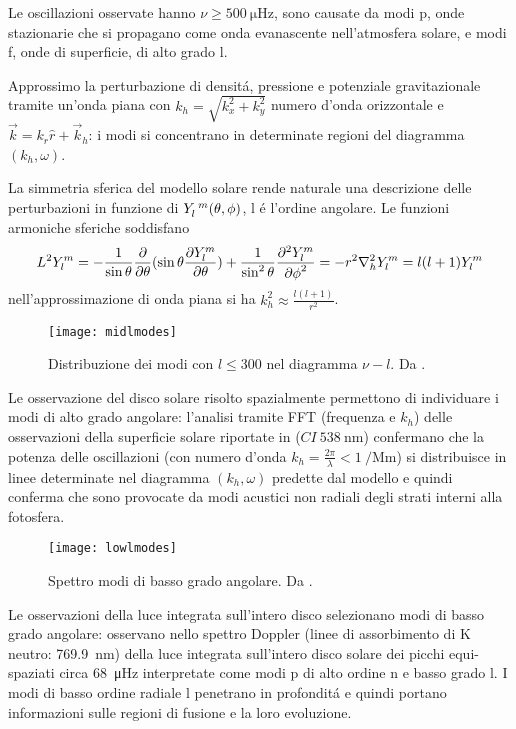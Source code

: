 \documentclass[../main.tex]{subfiles}
\begin{document}
Le oscillazioni osservate hanno $\nu\geq\SI{500}{\micro\hertz}$, sono causate da modi p, onde stazionarie che si propagano come onda evanascente nell'atmosfera solare, e modi f, onde di superficie, di alto grado l.

Approssimo la perturbazione di densit\'a, pressione e potenziale gravitazionale tramite un'onda piana con $k_h=\sqrt{k_x^2+k_y^2}$ numero d'onda orizzontale e $\vec{k}=k_r\hat{r}+\vec{k}_h$:  i modi si concentrano in determinate regioni del diagramma  $(k_h,\omega)$.

La simmetria sferica del modello solare rende naturale una descrizione delle perturbazioni in funzione di $Y\indices{_l^m}(\theta,\phi)$, l \'e l'ordine angolare. Le funzioni armoniche sferiche  soddisfano
\begin{equation}
L^2Y_l^m=-\frac{1}{\sin{\theta}}\frac{\partial}{\partial \theta}(\sin{\theta}\frac{\partial Y_l^m}{\partial \theta})+\frac{1}{\sin^2{\theta}}\frac{\partial^2 Y_l^m}{{\partial \phi}^2}=-r^2\nabla_h^2Y_l^m=l(l+1)Y_l^m\label{eq:SHperturb}
\end{equation}
nell'approssimazione di onda piana si ha $k_h^2\approx\frac{l(l+1)}{r^2}$.

\begin{minipage}[c][7cm][c]{\textwidth}
\begin{wrapfigure}[12]{r}{0.6\textwidth}
\centering
\texttt{[image: midlmodes]}
\caption{Distribuzione dei modi con $l\leq300$ nel diagramma $\nu-l$. Da \cite{chr02helioseismology}.}\label{fig:midlmodes}
\end{wrapfigure}
Le osservazione del disco solare risolto spazialmente permettono di individuare i modi di alto grado angolare: l'analisi tramite FFT (frequenza e $k_h$) delle osservazioni della superficie solare riportate in \citet{deu75observations} ($CI\ \SI{538}{\nano\meter}$) confermano che la  potenza delle oscillazioni (con numero d'onda $k_h=\frac{2\pi}{\lambda}<\SI{1}{\per\mega\meter}$) si distribuisce in linee determinate nel diagramma $(k_h,\omega)$ predette dal modello e quindi conferma che sono provocate da modi acustici non radiali degli strati interni alla fotosfera.
\end{minipage}

\begin{minipage}[c][7cm][t]{\textwidth}
\begin{wrapfigure}[11]{r}{0.6\textwidth}
\centering
\texttt{[image: lowlmodes]}
\caption{Spettro modi di basso grado angolare. Da \cite{chr02helioseismology}.}\label{fig:lowlmodes}
\end{wrapfigure}
Le osservazioni della luce integrata sull'intero disco selezionano modi di basso grado angolare: \citet{cla79solar} osservano nello spettro Doppler (linee di assorbimento di K neutro: \SI{769.9}{\nano\meter}) della luce integrata sull'intero disco solare dei picchi equi-spaziati circa \SI{68}{\micro\hertz} interpretate come modi p di alto ordine n e basso grado l. I modi di basso ordine radiale l penetrano in profondit\'a e quindi portano informazioni sulle regioni di fusione e la loro evoluzione.
\end{minipage}
\end{document}
